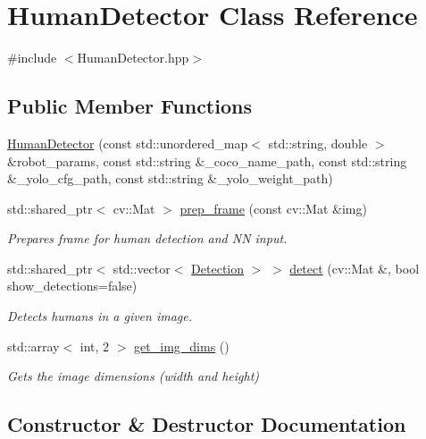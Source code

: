 \hypertarget{class_human_detector}{}\section{Human\+Detector Class Reference}
\label{class_human_detector}


{\ttfamily \#include $<$Human\+Detector.\+hpp$>$}

\subsection*{Public Member Functions}
\begin{DoxyCompactItemize}
\item 
\hyperlink{class_human_detector_a2c252c0c3cf460930daa63635f5219da}{Human\+Detector} (const std\+::unordered\+\_\+map$<$ std\+::string, double $>$ \&robot\+\_\+params, const std\+::string \&\+\_\+coco\+\_\+name\+\_\+path, const std\+::string \&\+\_\+yolo\+\_\+cfg\+\_\+path, const std\+::string \&\+\_\+yolo\+\_\+weight\+\_\+path)
\item 
std\+::shared\+\_\+ptr$<$ cv\+::\+Mat $>$ \hyperlink{class_human_detector_a32ae85763d07da7611f739cea9988308}{prep\+\_\+frame} (const cv\+::\+Mat \&img)
\begin{DoxyCompactList}\small\item\em Prepares frame for human detection and NN input. \end{DoxyCompactList}\item 
std\+::shared\+\_\+ptr$<$ std\+::vector$<$ \hyperlink{struct_detection}{Detection} $>$ $>$ \hyperlink{class_human_detector_ad63edaf628fd5fd819cfebfc5ce90466}{detect} (cv\+::\+Mat \&, bool show\+\_\+detections=false)
\begin{DoxyCompactList}\small\item\em Detects humans in a given image. \end{DoxyCompactList}\item 
std\+::array$<$ int, 2 $>$ \hyperlink{class_human_detector_a806bd77dc446642911093a6a1b1a6bf7}{get\+\_\+img\+\_\+dims} ()
\begin{DoxyCompactList}\small\item\em Gets the image dimensions (width and height) \end{DoxyCompactList}\end{DoxyCompactItemize}


\subsection{Constructor \& Destructor Documentation}
\mbox{\label{class_human_detector_a2c252c0c3cf460930daa63635f5219da}} 
